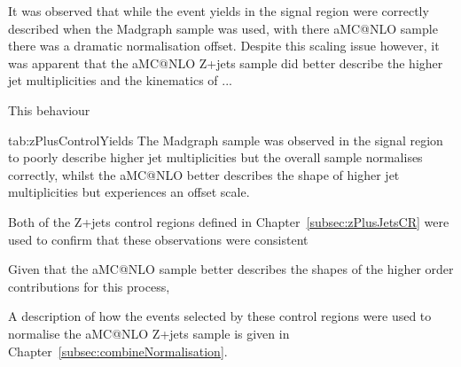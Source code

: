 It was observed that while the event yields in the signal region were correctly described when the Madgraph sample was used, with there aMC@NLO sample there was a dramatic normalisation offset.
Despite this scaling issue however, it was apparent that the aMC@NLO Z+jets sample did better describe the higher jet multiplicities and the kinematics of ...

This behaviour 

tab:zPlusControlYields
The Madgraph sample was observed in the signal region to poorly describe higher jet multiplicities but the overall sample normalises correctly, whilst the aMC@NLO better describes the shape of higher jet multiplicities but experiences an offset scale.

Both of the Z+jets control regions defined in Chapter~\ref{subsec:zPlusJetsCR} were used to confirm that these observations were consistent



Given that the aMC@NLO sample better describes the shapes of the higher order contributions for this process, 

A description of how the events selected by these control regions were used to normalise the aMC@NLO Z+jets sample is given in Chapter~\ref{subsec:combineNormalisation}.

